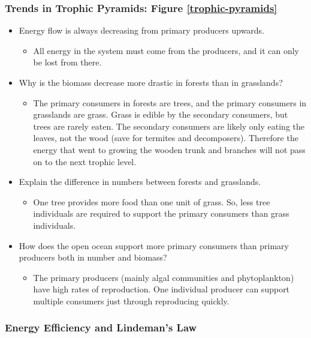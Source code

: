 \documentclass[12pt]{article}
\begin{document}
\subsubsection{Trends in Trophic Pyramids: Figure \ref{trophic-pyramids}}
\begin{itemize}
    \item Energy flow is always decreasing from primary producers upwards.
          \begin{itemize}
              \item All energy in the system must come from the producers, and it can only be lost from there.
          \end{itemize}
    \item Why is the biomass decrease more drastic in forests than in grasslands?
          \begin{itemize}
              \item The primary consumers in forests are trees, and the primary consumers in grasslands are grass. Grass is edible by the secondary consumers, but trees are rarely eaten. The secondary consumers are likely only eating the leaves, not the wood (save for termites and decomposers). Therefore the energy that went to growing the wooden trunk and branches will not pass on to the next trophic level.
          \end{itemize}
    \item Explain the difference in numbers between forests and grasslands.
          \begin{itemize}
              \item One tree provides more food than one unit of grass. So, less tree individuals are required to support the primary consumers than grass individuals.
          \end{itemize}
    \item How does the open ocean support more primary consumers than primary producers both in number and biomass?
          \begin{itemize}
              \item The primary producers (mainly algal communities and phytoplankton) have high rates of reproduction. One individual producer can support multiple consumers just through reproducing quickly.
          \end{itemize}
\end{itemize}

\subsubsection{Energy Efficiency and Lindeman's Law}
\end{document}
